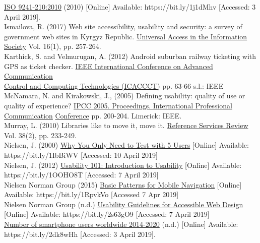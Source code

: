 \documentclass[version=last,fontsize=13pt]{scrartcl}
\begin{document}
\underline{ISO 9241-210:2010} (2010) [Online] Available: https://bit.ly/1j1dMhv [Accessed: 3 April 2019].\\

Ismailova, R. (2017) Web site accessibility, usability and security: a survey of government web sites in Kyrgyz Republic. \underline{Universal Access in the Information Society} Vol. 16(1), pp. 257-264. \\

Karthick, S. and Velmurugan, A. (2012) Android suburban railway ticketing with GPS as ticket checker.  \underline{IEEE International Conference on Advanced Communication }\\ \underline{Control and Computing Technologies (ICACCCT)} pp. 63-66  s.l.: IEEE\\

McNamara, N. and Kirakowski, J., (2005)  Defining usability: quality of use or quality of experience?  \underline{IPCC 2005. Proceedings. International Professional Communication} \underline{Conference} pp. 200-204. Limerick: IEEE.\\

Murray, L. (2010) Libraries like to move it, move it.  \underline{Reference Services Review} Vol. 38(2), pp. 233-249.\\

Nielsen, J. (2000) \underline{Why You Only Need to Test with 5 Users} [Online] Available:\\  https://bit.ly/1IbBiWV [Accessed: 10 April 2019]\\

Nielsen, J. (2012) \underline{Usability 101: Introduction to Usability} [Online] Available:\\ https://bit.ly/1OOHO8T [Accessed: 7 April 2019]\\

Nielsen Norman Group (2015) \underline{Basic Patterns for Mobile Navigation} [Online] Available: https://bit.ly/1RpvkVo [Accessed 7 Apr 2019]\\

Nielsen Norman Group (n.d.) \underline{Usability Guidelines for Accessible Web Design} [Online] Available:  https://bit.ly/2s63gO9 [Accessed: 7 April 2019]\\

\underline{Number of smartphone users worldwide 2014-2020} (n.d.) [Online]  Available:\\ https://bit.ly/2dk8wHh [Accessed: 3 April 2019].\\
\end{document}
